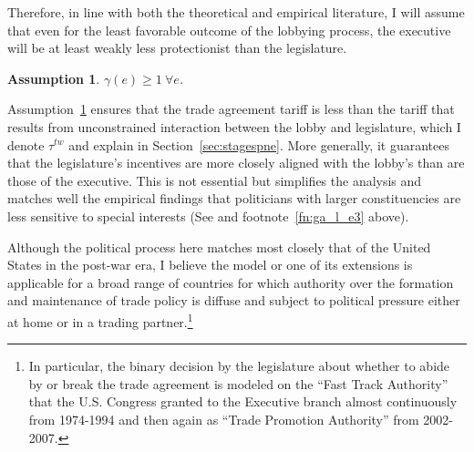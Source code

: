 \documentclass[authoryear, review]{elsarticle}
\newtheorem{assumption}{Assumption}
\newcommand{\ga}{\gamma}
\begin{document}
Therefore, in line with both the theoretical and empirical literature, I will assume that even for the least favorable outcome of the lobbying process, the executive will be at least weakly less protectionist than the legislature. 

\begin{assumption}
  $\ga(e) \geq 1 \ \forall e$.
  \label{as:ga_l_e3}
\end{assumption}

Assumption~\ref{as:ga_l_e3} ensures that the trade agreement tariff is less than the tariff that results from unconstrained interaction between the lobby and legislature, which I denote $\tau^{tw}$ and explain in Section~\ref{sec:stagespne}. More generally, it guarantees that the legislature's incentives are more closely aligned with the lobby's than are those of the executive. This is not essential but simplifies the analysis and matches well the empirical findings that politicians with larger constituencies are less sensitive to special interests (See \citet{destler} and footnote~\ref{fn:ga_l_e3} above).

Although the political process here matches most closely that of the United States in the post-war era, I believe the model or one of its extensions is applicable for a broad range of countries for which authority over the formation and maintenance of trade policy is diffuse and subject to political pressure either at home or in a trading partner.\footnote{In particular, the binary decision by the legislature about whether to abide by or break the trade agreement is modeled on the ``Fast Track Authority'' that the U.S. Congress granted to the Executive branch almost continuously from 1974-1994 and then again as ``Trade Promotion Authority'' from 2002-2007.} 
\end{document}

